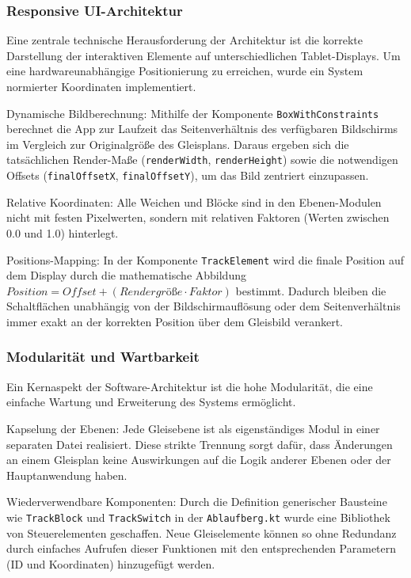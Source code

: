 \documentclass{article}
\begin{document}
\subsubsection{Responsive UI-Architektur}
Eine zentrale technische Herausforderung der Architektur ist die korrekte Darstellung der interaktiven Elemente auf unterschiedlichen Tablet-Displays. Um eine hardwareunabhängige Positionierung zu erreichen, wurde ein System normierter Koordinaten implementiert.

Dynamische Bildberechnung: Mithilfe der Komponente \texttt{BoxWithConstraints} berechnet die App zur Laufzeit das Seitenverhältnis des verfügbaren Bildschirms im Vergleich zur Originalgröße des Gleisplans. Daraus ergeben sich die tatsächlichen Render-Maße (\texttt{renderWidth}, \texttt{renderHeight}) sowie die notwendigen Offsets (\texttt{finalOffsetX}, \texttt{finalOffsetY}), um das Bild zentriert einzupassen.

Relative Koordinaten: Alle Weichen und Blöcke sind in den Ebenen-Modulen nicht mit festen Pixelwerten, sondern mit relativen Faktoren (Werten zwischen 0.0 und 1.0) hinterlegt.

Positions-Mapping: In der Komponente \texttt{TrackElement} wird die finale Position auf dem Display durch die mathematische Abbildung $Position = Offset + (Rendergr\text{ö\ss}e \cdot Faktor)$ bestimmt. Dadurch bleiben die Schaltflächen unabhängig von der Bildschirmauflösung oder dem Seitenverhältnis immer exakt an der korrekten Position über dem Gleisbild verankert.


\subsubsection{Modularität und Wartbarkeit}
Ein Kernaspekt der Software-Architektur ist die hohe Modularität, die eine einfache Wartung und Erweiterung des Systems ermöglicht.

Kapselung der Ebenen: Jede Gleisebene ist als eigenständiges Modul in einer separaten Datei realisiert. Diese strikte Trennung sorgt dafür, dass Änderungen an einem Gleisplan keine Auswirkungen auf die Logik anderer Ebenen oder der Hauptanwendung haben.

Wiederverwendbare Komponenten: Durch die Definition generischer Bausteine wie \texttt{TrackBlock} und \texttt{TrackSwitch} in der \texttt{Ablaufberg.kt} wurde eine Bibliothek von Steuerelementen geschaffen. Neue Gleiselemente können so ohne Redundanz durch einfaches Aufrufen dieser Funktionen mit den entsprechenden Parametern (ID und Koordinaten) hinzugefügt werden.
\end{document}

